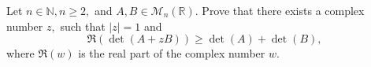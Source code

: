 Let $n \in \mathbb{N},n \ge 2,$ and $A,B \in \mathcal{M}_n(\mathbb{R}).$ Prove that there exists a complex number $z,$ such that $|z|=1$ and $$\Re \left( {\det(A+zB)} \right) \ge \det(A)+\det(B),$$where $\Re(w)$ is the real part of the complex number $w.$
